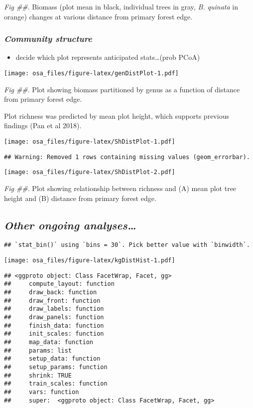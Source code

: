 \documentclass[]{article}
\providecommand{\tightlist}{%
  \setlength{\itemsep}{0pt}\setlength{\parskip}{0pt}}
\begin{document}
\emph{Fig \#\#}. Biomass (plot mean in black, individual trees in gray,
\emph{B. quinata} in orange) changes at various distance from primary
forest edge.

\hypertarget{community-structure-1}{%
\subsubsection{\texorpdfstring{\emph{Community
structure}}{Community structure}}\label{community-structure-1}}

\begin{itemize}
\tightlist
\item
  decide which plot represents anticipated stats\ldots{}(prob PCoA)
\end{itemize}

\texttt{[image: osa\_files/figure-latex/genDistPlot-1.pdf]}

\emph{Fig \#\#}. Plot showing biomass partitioned by genus as a function
of distance from primary forest edge.

Plot richness was predicted by mean plot height, which supports previous
findings (Pan et al 2018).

\texttt{[image: osa\_files/figure-latex/ShDistPlot-1.pdf]}

\begin{verbatim}
## Warning: Removed 1 rows containing missing values (geom_errorbar).
\end{verbatim}

\texttt{[image: osa\_files/figure-latex/ShDistPlot-2.pdf]}

\emph{Fig \#\#}. Plot showing relationship between richness and (A) mean
plot tree height and (B) distance from primary forest edge.

\hypertarget{other-ongoing-analyses}{%
\subsection{\texorpdfstring{\emph{Other ongoing
analyses\ldots{}}}{Other ongoing analyses\ldots{}}}\label{other-ongoing-analyses}}

\begin{verbatim}
## `stat_bin()` using `bins = 30`. Pick better value with `binwidth`.
\end{verbatim}

\texttt{[image: osa\_files/figure-latex/kgDistHist-1.pdf]}

\begin{verbatim}
## <ggproto object: Class FacetWrap, Facet, gg>
##     compute_layout: function
##     draw_back: function
##     draw_front: function
##     draw_labels: function
##     draw_panels: function
##     finish_data: function
##     init_scales: function
##     map_data: function
##     params: list
##     setup_data: function
##     setup_params: function
##     shrink: TRUE
##     train_scales: function
##     vars: function
##     super:  <ggproto object: Class FacetWrap, Facet, gg>
\end{verbatim}
\end{document}

